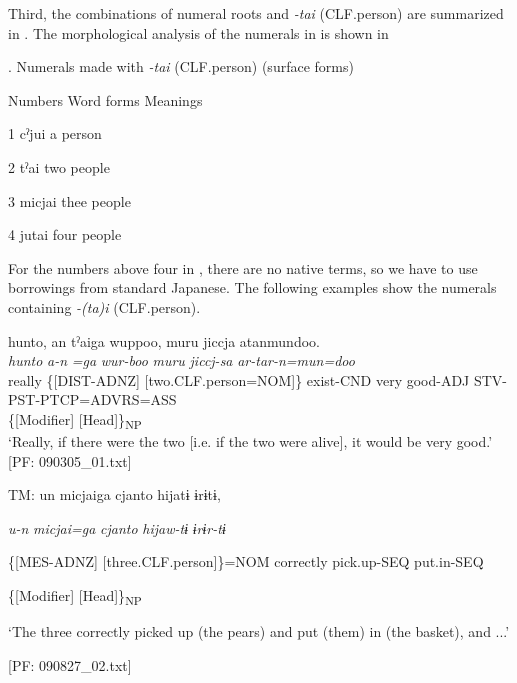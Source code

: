 Third, the combinations of numeral roots and \textit{{}-tai} (CLF.person) are summarized in . The morphological analysis of the numerals in  is shown in 

\begin{styleBeschriftung}
\textmd{}\textmd{. Numerals made with}\textmd{ \textit{-tai} }\textmd{(CLF.person) (surface forms)}
\end{styleBeschriftung}

Numbers  Word forms  Meanings

1  cˀjui  a person

2  tˀai  two people

3  micjai  thee people

4  jutai  four people

For the numbers above four in , there are no native terms, so we have to use borrowings from standard Japanese. The following examples show the numerals containing \textit{{}-(ta)i} (CLF.person).

\ea \label{ex:7:14}
\ea \label{ex:7:14a}
\gllll  hunto,  an  tˀaiga  wuppoo,  muru   jiccja  atanmundoo.\\
\textit{hunto}  \textit{a-n}  \textit{=ga}  \textit{wur-boo}  \textit{muru}  \textit{jiccj-sa}  \textit{ar-tar-n=mun=doo}\\
really  \{[DIST-ADNZ]  [two.CLF.person=NOM]\}  exist-CND  very   good-ADJ  STV-PST-PTCP=ADVRS=ASS\\
\{[Modifier]  [Head]\}\textsubscript{NP}    \\
\glt ‘Really, if there were the two [i.e. if the two were alive], it would be very good.’ [PF: 090305\_01.txt]

\ex \label{ex:7:14b}TM:  un  micjaiga  {\textbar}cjanto{\textbar}  hijatɨ  ɨrɨtɨ,

      \textit{u-n}  \textit{micjai=ga}  \textit{cjanto}  \textit{hijaw-tɨ}      \textit{ɨrɨr-tɨ}
                                                                             
      \{[MES-ADNZ]  [three.CLF.person]\}=NOM  correctly  pick.up-SEQ            put.in-SEQ

      \{[Modifier]  [Head]\}\textsubscript{NP}    

      ‘The three correctly picked up (the pears) and put (them) in (the basket), and ...’

      [PF: 090827\_02.txt]
    \z
\z

